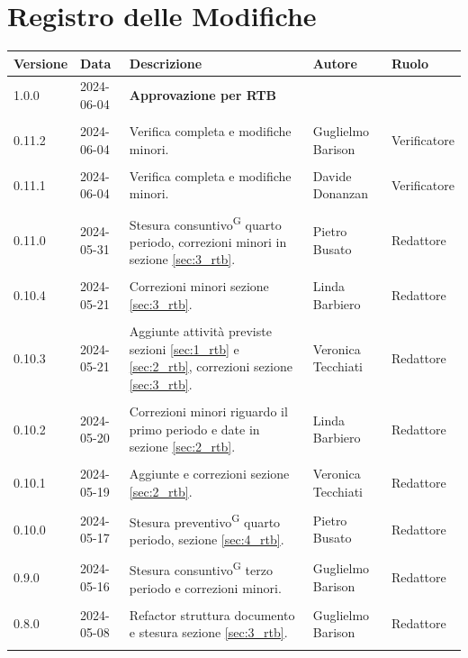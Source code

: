 \documentclass[8pt]{article}
\newcommand{\glossterm}[1]{#1\textsuperscript{G}} %
\begin{document}
\section*{Registro delle Modifiche}
\begin{table}[ht!]	
\hypersetup{hidelinks}
	\centering
	\begin{tabular}{p{1.2cm} p{2cm} p{6cm} p{3cm} p{2cm}}
		\toprule
		\textbf{Versione}& \textbf{Data} & \textbf{Descrizione} & \textbf{Autore} & \textbf{Ruolo} \\
		\midrule 
		1.0.0 & 2024-06-04 & \textbf{Approvazione per RTB} & & \\\\
		0.11.2 & 2024-06-04 & Verifica completa e modifiche minori. & Guglielmo Barison & Verificatore \\\\
		0.11.1 & 2024-06-04 & Verifica completa e modifiche minori. & Davide Donanzan & Verificatore \\\\
		0.11.0 & 2024-05-31 & Stesura \glossterm{consuntivo} quarto periodo, correzioni minori in sezione \ref{sec:3_rtb}. & Pietro Busato & Redattore \\\\
        0.10.4 & 2024-05-21 & Correzioni minori sezione \ref{sec:3_rtb}. & Linda Barbiero & Redattore \\\\
		0.10.3 & 2024-05-21 & Aggiunte attività previste sezioni \ref{sec:1_rtb} e \ref{sec:2_rtb}, correzioni sezione \ref{sec:3_rtb}. & Veronica Tecchiati & Redattore \\\\
        0.10.2 & 2024-05-20 & Correzioni minori riguardo il primo periodo e date in sezione \ref{sec:2_rtb}. & Linda Barbiero & Redattore \\\\
		0.10.1 & 2024-05-19 & Aggiunte e correzioni sezione \ref{sec:2_rtb}. & Veronica Tecchiati & Redattore \\\\
        0.10.0 & 2024-05-17 & Stesura \glossterm{preventivo} quarto periodo, sezione \ref{sec:4_rtb}. & Pietro Busato & Redattore \\\\
		0.9.0 & 2024-05-16 & Stesura \glossterm{consuntivo} terzo periodo e correzioni minori. & Guglielmo Barison & Redattore \\\\
        0.8.0 & 2024-05-08 & Refactor struttura documento e stesura sezione \ref{sec:3_rtb}. & Guglielmo Barison & Redattore \\\\

\end{tabular}
\end{table}
\end{document}
